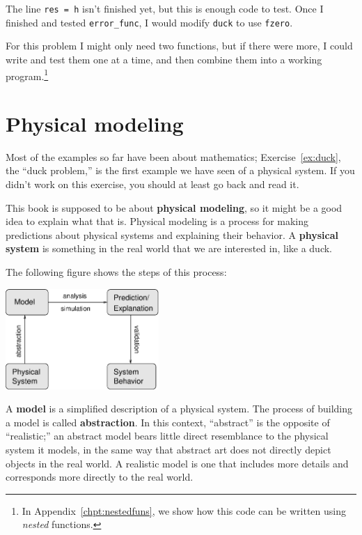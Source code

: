 \documentclass[
]{book}
\begin{document}
The line {\tt res = h} isn't finished yet, but this
is enough code to test.
Once I finished and tested {\tt error\_func}, I would modify
{\tt duck} to use {\tt fzero}.

For this problem I might only need two functions, but if there
were more, I could write and test them one at a time, and then
combine them into a working program.\footnote{In
Appendix~\ref{chpt:nestedfuns}, we show how this code can be written
using \textit{nested} functions.}



\section{Physical modeling}
\label{sect:modeling}

Most of the examples so far have been about mathematics;
Exercise~\ref{ex:duck}, the ``duck problem,'' is the first example we
have seen of a physical system.  If you didn't work on this exercise,
you should at least go back and read it.

This book is supposed to be about {\bf physical modeling}, so it might
be a good idea to explain what that is.  Physical modeling is a process
for making predictions about physical systems and explaining their
behavior.  A {\bf physical system} is something in the real
world that we are interested in, like a duck.

The following figure shows the steps of this process:

\beforefig \centerline{\includegraphics[height=1.5in]{figs/model.eps}}

A {\bf model} is a simplified description of a physical
system.  The process of building a model
is called {\bf abstraction}.  In
this context, ``abstract'' is the opposite of ``realistic;'' an abstract
model bears little direct resemblance to the physical system it models,
in the same way that abstract art does not directly depict objects in
the real world.  A realistic model is one that includes more details and
corresponds more directly to the real world.
\end{document}
